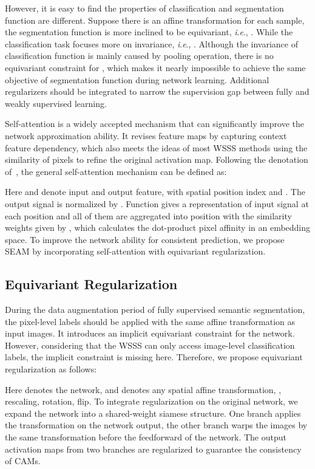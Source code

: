 \documentclass[10pt,twocolumn,letterpaper]{article}
\begin{document}
	However, it is easy to find the properties of classification and segmentation function are different. Suppose there is an affine transformation  for each sample, the segmentation function is more inclined to be equivariant, \textit{i}.\textit{e}., . While the classification task focuses more on invariance, \textit{i}.\textit{e}., . Although the invariance of classification function is mainly caused by pooling operation, there is no equivariant constraint for , which makes it nearly impossible to achieve the same objective of segmentation function during network learning. Additional regularizers should be integrated to narrow the supervision gap between fully and weakly supervised learning.
	
	Self-attention is a widely accepted mechanism that can significantly improve the network approximation ability. It revises feature maps by capturing context feature dependency, which also meets the ideas of most WSSS methods using the similarity of pixels to refine the original activation map. Following the denotation of~\cite{nonlocal}, the general self-attention mechanism can be defined as:
	
	
	Here  and  denote input and output feature, with spatial position index  and . The output signal is normalized by . Function  gives a representation of input signal  at each position and all of them are aggregated into position  with the similarity weights given by , which calculates the dot-product pixel affinity in an embedding space. To improve the network ability for consistent prediction, we propose SEAM by incorporating self-attention with equivariant regularization.
	
	\subsection{Equivariant Regularization}
	\label{subsec:er}
	
	During the data augmentation period of fully supervised semantic segmentation, the pixel-level labels should be applied with the same affine transformation as input images. It introduces an implicit equivariant constraint for the network. However, considering that the WSSS can only access image-level classification labels, the implicit constraint is missing here. Therefore, we propose equivariant regularization as follows:
	
	Here  denotes the network, and  denotes any spatial affine transformation, \eg, rescaling, rotation, flip. To integrate regularization on the original network, we expand the network into a shared-weight siamese structure. One branch applies the transformation on the network output, the other branch warps the images by the same transformation before the feedforward of the network. The output activation maps from two branches are regularized to guarantee the consistency of CAMs.
	
\end{document}
